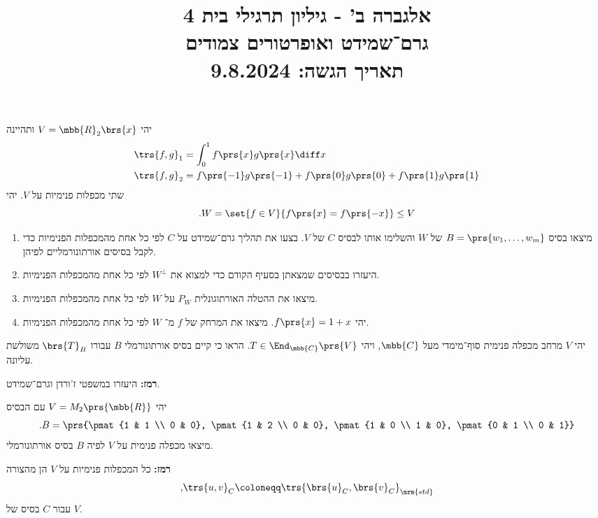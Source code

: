 \documentclass[a4paper,10pt,twoside,openany]{article}
\title{
אלגברה ב' - גיליון תרגילי בית 4 \\
גרם־שמידט ואופרטורים צמודים
\\
\vspace{1cm}
\large{תאריך הגשה: 9.8.2024}
}
\date{}
\begin{document}
\maketitle

\begin{exercise}%
יהי
$V = \mbb{R}_2\brs{x}$
ותהיינה
\begin{align*}
\trs{f,g}_1 &= \int_0^1 f\prs{x} g\prs{x} \diff x \\
\trs{f,g}_2 &= f\prs{-1} g\prs{-1} + f\prs{0} g\prs{0} + f\prs{1} g\prs{1}
\end{align*}
שתי מכפלות פנימיות על
$V$.
יהי
\[\text{.} W = \set{f \in V}{f\prs{x} = f\prs{-x}} \leq V\]
\begin{enumerate}
\item 
מיצאו בסיס
$B = \prs{w_1, \ldots, w_m}$
של
$W$
והשלימו אותו לבסיס
$C$
של
$V$.
בצעו את תהליך גרם־שמידט על
$C$
לפי כל אחת מהמכפלות הפנימיות כדי לקבל בסיסים אורתונורמליים לפיהן.

\item
היעזרו בבסיסים שמצאתן בסעיף הקודם כדי למצוא
את
$W^\perp$
לפי כל אחת מהמכפלות הפנימיות.

\item
מיצאו את ההטלה האורתוגונלית
$P_W$
על
$W$
לפי כל אחת מהמכפלות הפנימיות.

\item
יהי
$f\prs{x} = 1 + x$.
מיצאו את המרחק של
$f$
מ־%
$W$
לפי כל אחת מהמכפלות הפנימיות.
\end{enumerate}
\end{exercise}

\begin{exercise}%
יהי
$V$
מרחב מכפלה פנימית סוף־מימדי מעל
$\mbb{C}$,
ויהי
$T \in \End_{\mbb{C}}\prs{V}$.
הראו כי קיים בסיס אורתונורמלי
$B$
עבורו
$\brs{T}_B$
משולשת עליונה.

\textbf{רמז:}
היעזרו במשפטי ז'ורדן וגרם־שמידט.
\end{exercise}

\begin{exercise}%
יהי
$V = M_2\prs{\mbb{R}}$
עם הבסיס
\[\text{.} B = \prs{\pmat{1 & 1 \\ 0 & 0}, \pmat{1 & 2 \\ 0 & 0}, \pmat{1 & 0 \\ 1 & 0}, \pmat{0 & 1 \\ 0 & 1}}\]
מיצאו מכפלה פנימית על
$V$
לפיה
$B$
בסיס אורתונורמלי.

\textbf{רמז:}
כל המכפלות פנימיות על
$V$
הן מהצורה
\[\text{,} \trs{u,v}_C \coloneqq \trs{\brs{u}_C, \brs{v}_C}_{\mrm{std}}\]
עבור
$C$
בסיס של
$V$.
\end{exercise}
\end{document}

